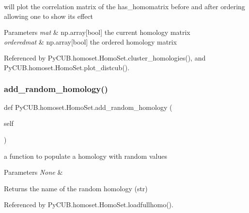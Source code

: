 will plot the correlation matrix of the has\+\_\+homomatrix before and after ordering allowing one to show its effect 


\begin{DoxyParams}{Parameters}
{\em mat} & np.\+array\mbox{[}bool\mbox{]} the current homology matrix \\
\hline
{\em orderedmat} & np.\+array\mbox{[}bool\mbox{]} the ordered homology matrix \\
\hline
\end{DoxyParams}


Referenced by Py\+C\+U\+B.\+homoset.\+Homo\+Set.\+cluster\+\_\+homologies(), and Py\+C\+U\+B.\+homoset.\+Homo\+Set.\+plot\+\_\+distcub().

\mbox{\label{class_py_c_u_b_1_1homoset_1_1_homo_set_a05935a3f03f2e2b61b2f3e7e0222e2a9}} 
\subsubsection{\texorpdfstring{add\+\_\+random\+\_\+homology()}{add\_random\_homology()}}
{\footnotesize\ttfamily def Py\+C\+U\+B.\+homoset.\+Homo\+Set.\+add\+\_\+random\+\_\+homology (\begin{DoxyParamCaption}\item[{}]{self }\end{DoxyParamCaption})}



a function to populate a homology with random values 


\begin{DoxyParams}{Parameters}
{\em None} & \\
\hline
\end{DoxyParams}
\begin{DoxyReturn}{Returns}
the name of the random homology (str) 
\end{DoxyReturn}


Referenced by Py\+C\+U\+B.\+homoset.\+Homo\+Set.\+loadfullhomo().

\mbox{\label{class_py_c_u_b_1_1homoset_1_1_homo_set_a2062c7f9c3c956d43172e1688504826a}} 
